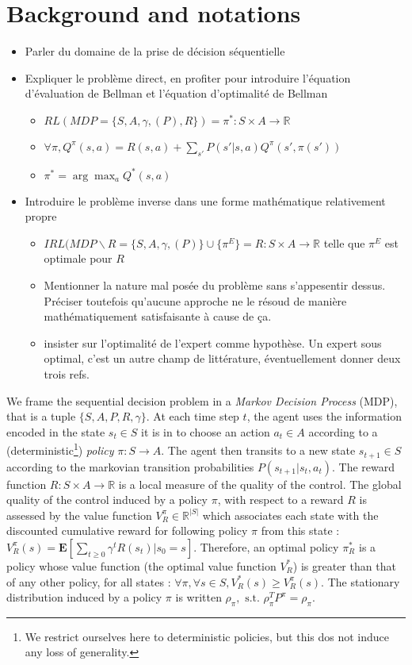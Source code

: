 \documentclass[11pt]{article}
\newcommand{\E}{\mathbf{E}}
\begin{document}
\section{Background and notations}
\label{sec-3}
\begin{itemize}
\item Parler du domaine de la prise de décision séquentielle
\item Expliquer le problème direct, en profiter pour introduire l'équation d'évaluation de Bellman et l'équation d'optimalité de Bellman
\begin{itemize}
\item $RL(MDP=\{S,A,\gamma,(P),R\}) = \pi^*:S\times A \rightarrow \mathbb{R}$
\item $\forall \pi, Q^\pi(s,a) = R(s,a) + \sum_{s'}P(s'|s,a)Q^\pi(s',\pi(s'))$
\item $\pi^* = \arg\max_aQ^*(s,a)$
\end{itemize}
\item Introduire le problème inverse dans une forme mathématique relativement propre
\begin{itemize}
\item $IRL( MDP\backslash R = \{S,A,\gamma,(P)\} \cup \{\pi^E\} = R : S\times A \rightarrow \mathbb{R}$ telle que $\pi^E$ est optimale pour $R$
\item Mentionner la nature mal posée du problème sans s'appesentir dessus. Préciser toutefois qu'aucune approche ne le résoud de manière mathématiquement satisfaisante à cause de ça.
\item insister sur l'optimalité de l'expert comme hypothèse. Un expert sous optimal, c'est un autre champ de littérature, éventuellement donner deux trois refs.
\end{itemize}
\end{itemize}
We frame the sequential decision problem in a \emph{Markov Decision Process} (MDP), that is a tuple $\{S,A,P,R,\gamma\}$. At each time step $t$, the agent uses the information encoded in the state $s_t\in S$ it is in to choose an action $a_t \in A$ according to a (deterministic\footnote{We restrict ourselves here to deterministic policies, but this dos not induce any loss of generality.}) \emph{policy} $\pi: S \rightarrow A$. The agent then transits to a new state $s_{t+1}\in S$ according to the markovian transition probabilities $P(s_{t+1}|s_t,a_t)$. The reward function $R : S\times A \rightarrow \mathbb{R}$ is a local measure of the quality of the control. The global quality of the control induced by a policy $\pi$, with respect to a reward $R$ is assessed by the value function $V^\pi_R \in \mathbb{R}^{|S|}$ which associates each state with the discounted cumulative reward for following policy $\pi$ from this state : $V^\pi_R(s) = \E[\sum_{t\geq 0}\gamma^tR(s_t)|s_0 = s]$. Therefore, an optimal policy $\pi^*_R$ is a policy whose value function (the optimal value function $V^*_R$) is greater than that of any other policy, for all states : $\forall \pi, \forall s \in S, V^*_R(s) \geq V^\pi_R(s)$. The stationary distribution induced by a policy $\pi$ is written $\rho_\pi,\textrm{ s.t. }\rho_\pi^TP^\pi = \rho_\pi$.
\end{document}
